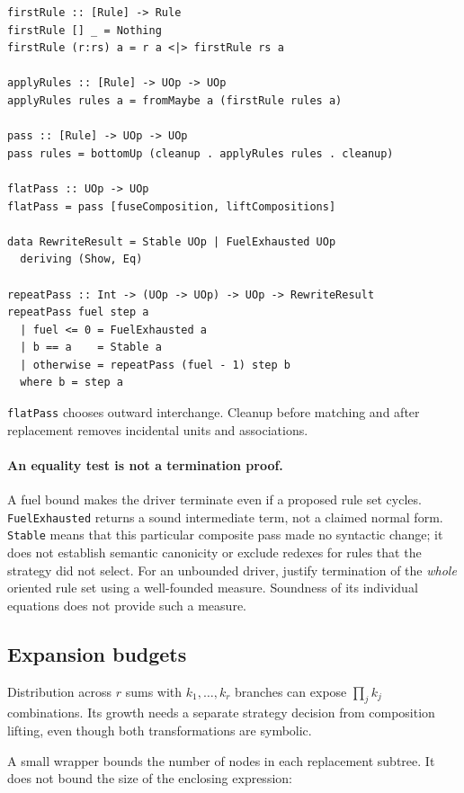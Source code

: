 \documentclass[11pt,a4paper]{article}
\newcommand{\code}[1]{\texttt{#1}}
\begin{document}
\begin{lstlisting}
firstRule :: [Rule] -> Rule
firstRule [] _ = Nothing
firstRule (r:rs) a = r a <|> firstRule rs a

applyRules :: [Rule] -> UOp -> UOp
applyRules rules a = fromMaybe a (firstRule rules a)

pass :: [Rule] -> UOp -> UOp
pass rules = bottomUp (cleanup . applyRules rules . cleanup)

flatPass :: UOp -> UOp
flatPass = pass [fuseComposition, liftCompositions]

data RewriteResult = Stable UOp | FuelExhausted UOp
  deriving (Show, Eq)

repeatPass :: Int -> (UOp -> UOp) -> UOp -> RewriteResult
repeatPass fuel step a
  | fuel <= 0 = FuelExhausted a
  | b == a    = Stable a
  | otherwise = repeatPass (fuel - 1) step b
  where b = step a
\end{lstlisting}

\code{flatPass} chooses outward interchange. Cleanup before matching
and after replacement removes incidental units and associations.

\paragraph{An equality test is not a termination proof.}
A fuel bound makes the driver terminate even if a proposed rule set
cycles. \code{FuelExhausted} returns a sound intermediate term, not a
claimed normal form. \code{Stable} means that this particular composite
pass made no syntactic change; it does not establish semantic canonicity
or exclude redexes for rules that the strategy did not select. For an
unbounded driver, justify termination of the \emph{whole} oriented rule
set using a well-founded measure. Soundness of its individual equations
does not provide such a measure.

\subsection{Expansion budgets}

\label{sec:budgets}

Distribution across $r$ sums with $k_1,\ldots,k_r$ branches can expose
$\prod_j k_j$ combinations. Its growth needs a separate strategy decision
from composition lifting, even though both transformations are symbolic.

A small wrapper bounds the number of nodes in each replacement subtree.
It does not bound the size of the enclosing expression:
\end{document}
